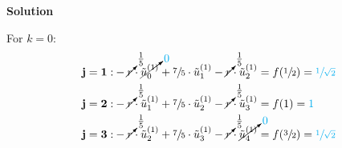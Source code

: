 \textbf{Solution}

For $k=0$:
\begin{align*}
	\mathbf{j=1} : & -\cancelto{\frac{1}{5}}{r}\cdot\cancelto{\color{cyan}0}{\tilde{u}_{0}^{(1)}} + \sfrac{7}{5}\cdot\tilde{u}_1^{(1)} - \cancelto{\frac{1}{5}}{r}\cdot\tilde{u}_2^{(1)} = f(\sfrac{1}{2}) = {\color{cyan}\sfrac{1}{\sqrt{2}}} \\
	\mathbf{j=2} : & -\cancelto{\frac{1}{5}}{r}\cdot\tilde{u}_{1}^{(1)} + \sfrac{7}{5}\cdot\tilde{u}_2^{(1)} - \cancelto{\frac{1}{5}}{r}\cdot\tilde{u}_3^{(1)} = f(1) = {\color{cyan}1} \\
	\mathbf{j=3} : & -\cancelto{\frac{1}{5}}{r}\cdot\tilde{u}_{2}^{(1)} + \sfrac{7}{5}\cdot\tilde{u}_3^{(1)} - \cancelto{\frac{1}{5}}{r}\cdot\cancelto{\color{cyan}0}{\tilde{u}_4^{(1)}} = f(\sfrac{3}{2}) = {\color{cyan}\sfrac{1}{\sqrt{2}}} \\
\end{align*}

